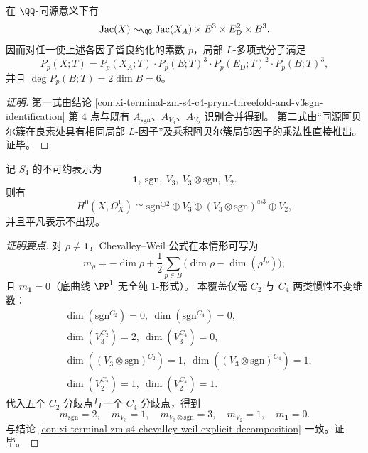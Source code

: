 \begin{conclusion}\label{con:xi-terminal-zm-s4-hasse-weil-full-factorization-rigid-exponents}
在 \(\QQ\)-同源意义下有
\[
\mathrm{Jac}(X)\sim_{\QQ}\mathrm{Jac}(X_A)\times E^3\times E_{\mathrm D}^2\times B^3.
\]
因而对任一使上述各因子皆良约化的素数 \(p\)，局部 \(L\)-多项式分子满足
\[
P_p(X;T)
=P_p(X_A;T)\cdot P_p(E;T)^3\cdot P_p(E_{\mathrm D};T)^2\cdot P_p(B;T)^3,
\]
并且
\(
\deg P_p(B;T)=2\dim B=6
\)。
\end{conclusion}
\begin{proof}[证明]
第一式由结论
\ref{con:xi-terminal-zm-s4-c4-prym-threefold-and-v3sgn-identification}
第 \(4\) 点与既有 \(A_{\mathrm{sgn}}\)、\(A_{V_3}\)、\(A_{V_2}\) 识别合并得到。
第二式由“同源阿贝尔簇在良素处具有相同局部 \(L\)-因子”及乘积阿贝尔簇局部因子的乘法性直接推出。证毕。
\end{proof}

\begin{conclusion}\label{con:xi-terminal-zm-s4-holomorphic-oneforms-chevalley-weil-rigid-decomposition}
记 \(S_4\) 的不可约表示为
\[
\mathbf 1,\ \mathrm{sgn},\ V_3,\ V_3\otimes\mathrm{sgn},\ V_2.
\]
则有
\[
H^0(X,\Omega_X^1)\cong
\mathrm{sgn}^{\oplus 2}\oplus V_3\oplus (V_3\otimes\mathrm{sgn})^{\oplus 3}\oplus V_2,
\]
并且平凡表示不出现。
\end{conclusion}
\begin{proof}[证明要点]
对 \(\rho\neq \mathbf 1\)，Chevalley--Weil 公式在本情形可写为
\[
m_\rho=-\dim\rho+\frac12\sum_{p\in B}\bigl(\dim\rho-\dim(\rho^{I_p})\bigr),
\]
且 \(m_{\mathbf 1}=0\)（底曲线 \(\PP^1\) 无全纯 \(1\)-形式）。
本覆盖仅需 \(C_2\) 与 \(C_4\) 两类惯性不变维数：
\[
\begin{aligned}
&\dim(\mathrm{sgn}^{C_2})=0,\ \dim(\mathrm{sgn}^{C_4})=0,\\
&\dim(V_3^{C_2})=2,\ \dim(V_3^{C_4})=0,\\
&\dim((V_3\!\otimes\!\mathrm{sgn})^{C_2})=1,\ \dim((V_3\!\otimes\!\mathrm{sgn})^{C_4})=1,\\
&\dim(V_2^{C_2})=1,\ \dim(V_2^{C_4})=1.
\end{aligned}
\]
代入五个 \(C_2\) 分歧点与一个 \(C_4\) 分歧点，得到
\[
m_{\mathrm{sgn}}=2,\quad m_{V_3}=1,\quad m_{V_3\otimes\mathrm{sgn}}=3,\quad m_{V_2}=1,\quad m_{\mathbf 1}=0.
\]
与结论 \ref{con:xi-terminal-zm-s4-chevalley-weil-explicit-decomposition} 一致。证毕。
\end{proof}


